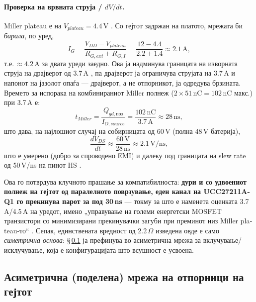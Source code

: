 \documentclass[11pt,a4paper]{article}
\newcommand{\eng}[1]{\textenglish{#1}}
\begin{document}
\paragraph{Проверка на врвната струја / $dV/dt$.} \eng{Miller plateau} е на $V_{plateau}=4.4$\,V \cite{ref1}. Со гејтот задржан на платото, мрежата би \emph{барала}, по уред,
\begin{equation}
I_{G} = \frac{V_{DD} - V_{plateau}}{R_{G,ext} + R_{G,I}} = \frac{12 - 4.4}{2.2 + 1.4} \approx 2.1\,\mathrm{A},
\end{equation}
т.е.\,$\approx 4.2$\,A за двата уреди заедно. Ова ја надминува границата на изворната струја на драјверот од 3.7\,A \cite{ref3}, па драјверот ја ограничува струјата на 3.7\,A и напонот на јазолот опаѓа --- драјверот, а не отпорникот, ја одредува брзината. Времето за испорака на комбинираниот \eng{Miller} полнеж ($2\times 51\,\mathrm{nC}=102$\,nC макс.) при 3.7\,A е:
\begin{equation}
t_{Miller} = \frac{Q_{gd,\text{поз}}}{I_{O,source}} = \frac{102\,\mathrm{nC}}{3.7\,\mathrm{A}} \approx 28\,\mathrm{ns},
\end{equation}
што дава, на најлошиот случај на собирницата од 60\,V (полна 48\,V батерија),
\begin{equation}
\frac{dV_{DS}}{dt} \approx \frac{60\,\mathrm{V}}{28\,\mathrm{ns}} \approx 2.1\,\mathrm{V/ns},
\end{equation}
што е умерено (добро за спроводено EMI) и далеку под границата на \eng{slew rate} од 50\,V/ns на пинот HS \cite{ref3}.

Ова го потврдува клучното прашање за компатибилноста: \textbf{дури и со удвоениот полнеж на гејтот од паралелното поврзување, еден канал на UCC27211A-Q1 го прекинува парот за под 30\,ns} --- токму за што е наменета оценката 3.7\,A/4.5\,A на уредот, имено „управување на големи енергетски MOSFET транзистори со минимизирани прекинувачки загуби при преминот низ \eng{Miller plateau}-то“ \cite{ref3}. Сепак, единствената вредност од 2.2\,$\Omega$ изведена овде е само \emph{симетрична основа}: \S\,\ref{sec:asym} ја префинува во асиметрична мрежа за вклучување/исклучување, која е конфигурацијата што всушност е усвоена.

\subsection{Асиметрична (поделена) мрежа на отпорници на гејтот}
\label{sec:asym}
\end{document}

